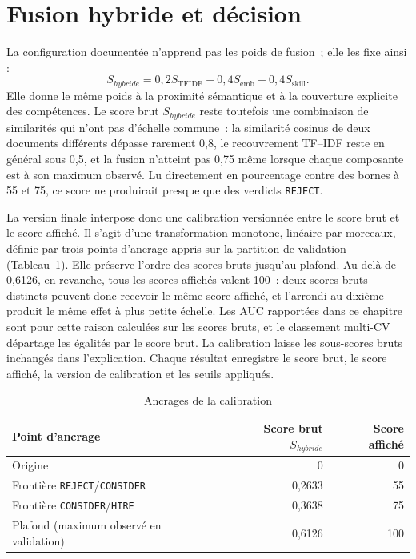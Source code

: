 \section{Fusion hybride et décision}

La configuration documentée n'apprend pas les poids de fusion~; elle les fixe ainsi :
\[
 S_{hybride}=0{,}2S_{\mathrm{TFIDF}}+0{,}4S_{\mathrm{emb}}+0{,}4S_{\mathrm{skill}}.
\]
Elle donne le même poids à la proximité sémantique et à la couverture explicite des compétences. Le score brut $S_{hybride}$ reste toutefois une combinaison de similarités qui n'ont pas d'échelle commune~: la similarité cosinus de deux documents différents dépasse rarement 0,8, le recouvrement TF--IDF reste en général sous 0,5, et la fusion n'atteint pas 0,75 même lorsque chaque composante est à son maximum observé. Lu directement en pourcentage contre des bornes à 55 et 75, ce score ne produirait presque que des verdicts \texttt{REJECT}.

La version finale interpose donc une calibration versionnée entre le score brut et le score affiché. Il s'agit d'une transformation monotone, linéaire par morceaux, définie par trois points d'ancrage appris sur la partition de validation (Tableau~\ref{tab:chap4-calibration}). Elle préserve l'ordre des scores bruts jusqu'au plafond. Au-delà de 0,6126, en revanche, tous les scores affichés valent 100~: deux scores bruts distincts peuvent donc recevoir le même score affiché, et l'arrondi au dixième produit le même effet à plus petite échelle. Les AUC rapportées dans ce chapitre sont pour cette raison calculées sur les scores bruts, et le classement multi-CV départage les égalités par le score brut. La calibration laisse les sous-scores bruts inchangés dans l'explication. Chaque résultat enregistre le score brut, le score affiché, la version de calibration et les seuils appliqués.

\begin{table}[htbp]
  \centering
  \caption{Ancrages de la calibration}
  \label{tab:chap4-calibration}
  \begin{tabular}{|l|r|r|}
    \hline
    Point d'ancrage & Score brut $S_{hybride}$ & Score affiché \\
    \hline
    Origine & 0 & 0 \\
    \hline
    Frontière \texttt{REJECT}/\texttt{CONSIDER} & 0,2633 & 55 \\
    \hline
    Frontière \texttt{CONSIDER}/\texttt{HIRE} & 0,3638 & 75 \\
    \hline
    Plafond (maximum observé en validation) & 0,6126 & 100 \\
    \hline
  \end{tabular}
\end{table}

